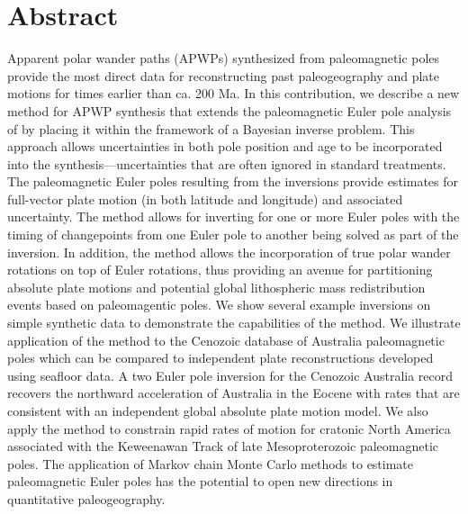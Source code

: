 \documentclass[11pt,letterpaper]{article}
\begin{document}
\section*{Abstract \label{sec:ABSTRACT}}
Apparent polar wander paths (APWPs) synthesized from paleomagnetic poles provide the most direct data for reconstructing past paleogeography and plate motions for times earlier than ca. 200 Ma. In this contribution, we describe a new method for APWP synthesis that extends the paleomagnetic Euler pole analysis of \cite{Gordon1984a} by placing it within the framework of a Bayesian inverse problem. This approach allows uncertainties in both pole position and age to be incorporated into the synthesis---uncertainties that are often ignored in standard treatments. The paleomagnetic Euler poles resulting from the inversions provide estimates for full-vector plate motion (in both latitude and longitude) and associated uncertainty. The method allows for inverting for one or more Euler poles with the timing of changepoints from one Euler pole to another being solved as part of the inversion. In addition, the method allows the incorporation of true polar wander rotations on top of Euler rotations, thus providing an avenue for partitioning absolute plate motions and potential global lithospheric mass redistribution events based on paleomagentic poles. We show several example inversions on simple synthetic data to demonstrate the capabilities of the method. We illustrate application of the method to the Cenozoic database of Australia paleomagnetic poles which can be compared to independent plate reconstructions developed using seafloor data. A two Euler pole inversion for the Cenozoic Australia record recovers the northward acceleration of Australia in the Eocene with rates that are consistent with an independent global absolute plate motion model. We also apply the method to constrain rapid rates of motion for cratonic North America associated with the Keweenawan Track of late Mesoproterozoic paleomagnetic poles. The application of Markov chain Monte Carlo methods to estimate paleomagnetic Euler poles has the potential to open new directions in quantitative paleogeography.
\end{document}
